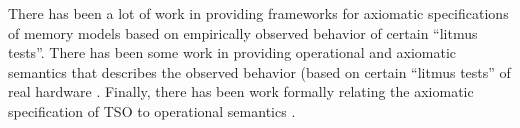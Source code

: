 
There has been a lot of work in providing frameworks for axiomatic
specifications of memory models based on empirically observed behavior of
certain ``litmus
tests''\cite{Alglave11,Alglave:FMSD,alglave2012formal,Alglave:2010,Alglave:TACAS,alglave2014herding}.
There has been some work in providing operational and axiomatic semantics that
describes the observed behavior (based on certain ``litmus tests'' of real
hardware
\cite{mador2012axiomatic,sarkar2011understanding,sarkar2012synchronising}.
Finally, there has been work formally relating the axiomatic specification of
TSO to operational semantics \cite{x86tsocacm10}.


%

